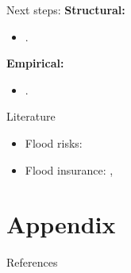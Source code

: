 \documentclass[xcolor=dvipsnames, aspectratio = 169]{beamer}
\begin{document}
{%
\begin{frame}{Next steps:}
\textbf{Structural:}
\begin{itemize}
  \item .
\end{itemize}

\textbf{Empirical:}
\begin{itemize}
  \item .
\end{itemize}

\end{frame}

\begin{frame}{Literature}
    \begin{itemize}
        \item Flood risks: \citet{bakkensen2022}
        \item Flood insurance: \citet{hennighausen2023}, \citet{collier2023}
    \end{itemize}
\end{frame}

\appendix

\section{Appendix}



\begin{frame}[allowframebreaks]{References}
	\small
	
	
\end{frame}

}



\end{document}
